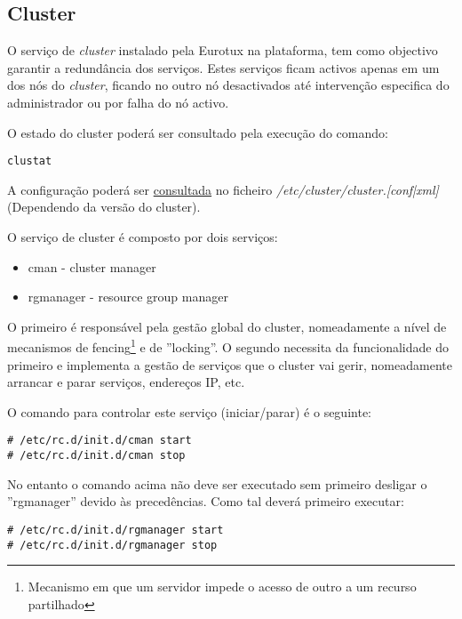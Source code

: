 \subsection{Cluster}

O serviço de \emph{cluster} instalado pela Eurotux na plataforma, tem como objectivo garantir a redundância dos serviços.
Estes serviços ficam activos apenas em um dos nós do \emph{cluster}, ficando no outro nó desactivados até intervenção especifica do administrador ou por falha do nó activo.

O estado do cluster poderá ser consultado pela execução do comando:

\begin{Verbatim}[commandchars=\\\{\}]
clustat
\end{Verbatim}

A configuração poderá ser \underline{consultada} no ficheiro \emph{/etc/cluster/cluster.[conf|xml]} (Dependendo da versão do cluster).

O serviço de cluster é composto por dois serviços:

\begin{itemize}
	\item cman - cluster manager
	\item rgmanager - resource group manager
\end{itemize}

O primeiro é responsável pela gestão global do cluster, nomeadamente a nível de mecanismos de fencing\footnote{Mecanismo em que um servidor impede o acesso de outro a um recurso partilhado} e de ''locking''. O segundo necessita da funcionalidade do primeiro e implementa a gestão de serviços que o cluster vai gerir, nomeadamente arrancar e parar serviços, endereços IP, etc.

O comando para controlar este serviço (iniciar/parar) é o seguinte:

\begin{Verbatim}[commandchars=\\\{\}]
# /etc/rc.d/init.d/cman start
# /etc/rc.d/init.d/cman stop
\end{Verbatim}

No entanto o comando acima não deve ser executado sem primeiro desligar o ''rgmanager'' devido às precedências. Como tal deverá primeiro executar:


\begin{Verbatim}[commandchars=\\\{\}]
# /etc/rc.d/init.d/rgmanager start
# /etc/rc.d/init.d/rgmanager stop
\end{Verbatim}

